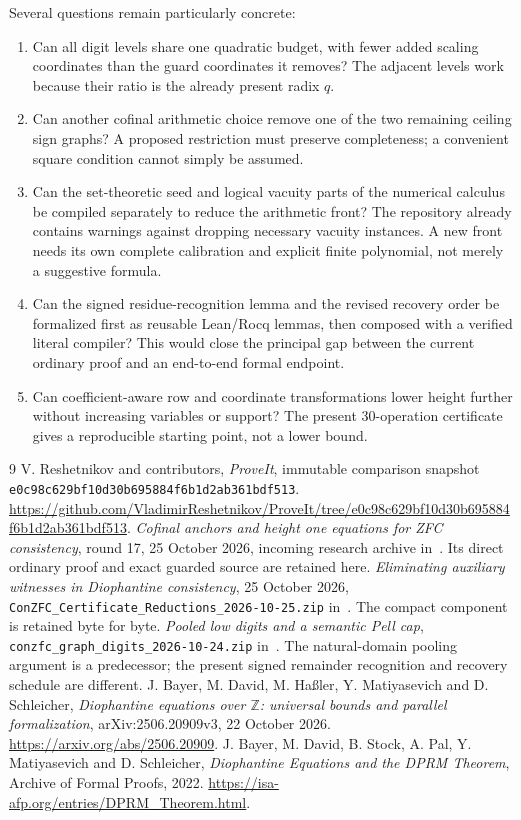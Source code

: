 \documentclass[11pt]{article}
\newcommand{\Z}{\mathbb Z}
\newcommand{\code}[1]{\texttt{\small #1}}
\begin{document}
Several questions remain particularly concrete:
\begin{enumerate}
\item Can all digit levels share one quadratic budget, with fewer added
scaling coordinates than the guard coordinates it removes? The adjacent
levels work because their ratio is the already present radix $q$.
\item Can another cofinal arithmetic choice remove one of the two
remaining ceiling sign graphs? A proposed restriction must preserve
completeness; a convenient square condition cannot simply be assumed.
\item Can the set-theoretic seed and logical vacuity parts of the
numerical calculus be compiled separately to reduce the arithmetic front?
The repository already contains warnings against dropping necessary
vacuity instances. A new front needs its own complete calibration and
explicit finite polynomial, not merely a suggestive formula.
\item Can the signed residue-recognition lemma and the revised recovery
order be formalized first as reusable Lean/Rocq lemmas, then composed
with a verified literal compiler? This would close the principal gap
between the current ordinary proof and an end-to-end formal endpoint.
\item Can coefficient-aware row and coordinate transformations lower
height further without increasing variables or support? The present
30-operation certificate gives a reproducible starting point, not a
lower bound.
\end{enumerate}

\begin{thebibliography}{9}
V. Reshetnikov and contributors,
\emph{ProveIt}, immutable comparison snapshot
\code{e0c98c629bf10d30b695884f6b1d2ab361bdf513}.
\url{https://github.com/VladimirReshetnikov/ProveIt/tree/e0c98c629bf10d30b695884f6b1d2ab361bdf513}.
\emph{Cofinal anchors and height one equations for ZFC consistency},
round 17, 25 October 2026, incoming research archive in~\cite{repo}.
Its direct ordinary proof and exact guarded source are retained here.
\emph{Eliminating auxiliary witnesses in Diophantine consistency},
25 October 2026, \code{ConZFC\_Certificate\_Reductions\_2026-10-25.zip}
in~\cite{repo}. The compact component is retained byte for byte.
\emph{Pooled low digits and a semantic Pell cap},
\code{conzfc\_graph\_digits\_2026-10-24.zip} in~\cite{repo}.
The natural-domain pooling argument is a predecessor; the present signed
remainder recognition and recovery schedule are different.
J. Bayer, M. David, M. Ha\ss ler, Y. Matiyasevich and D. Schleicher,
\emph{Diophantine equations over $\Z$: universal bounds and parallel
formalization}, arXiv:2506.20909v3, 22 October 2026.
\url{https://arxiv.org/abs/2506.20909}.
J. Bayer, M. David, B. Stock, A. Pal, Y. Matiyasevich and D. Schleicher,
\emph{Diophantine Equations and the DPRM Theorem}, Archive of Formal
Proofs, 2022. \url{https://isa-afp.org/entries/DPRM_Theorem.html}.
\end{thebibliography}
\end{document}
